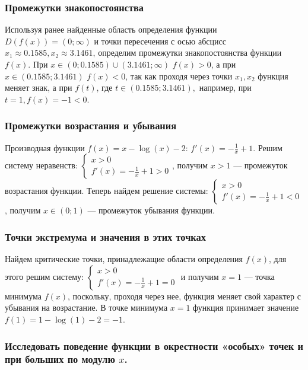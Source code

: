 \documentclass[14pt]{extreport}
\begin{document}
\subsubsection{Промежутки знакопостоянства}

Используя ранее найденные область определения функции $D(f(x)) = (0;\infty)$ и точки пересечения с осью
абсцисс $x_1 \approx 0.1585, x_2 \approx 3.1461$, определим промежутки знакопостоянства функции $f(x)$. 
При $x \in (0; 0.1585)\cup (3.1461; \infty)$ $f(x) > 0$, а при $x \in (0.1585; 3.1461)$ $f(x) < 0$, так как
проходя через точки $x_1, x_2$ функция меняет знак, а при $f(t)$, где $t \in (0.1585; 3.1461),$ например,
при $t = 1, f(x) = -1 < 0$.

\subsubsection{Промежутки возрастания и убывания}

Производная функции $f(x) = x - \log{(x)} - 2$: $f'(x) = -\frac{1}{x} + 1$. Решим систему неравенств:
$\begin{cases}x > 0\\f'(x) = -\frac{1}{x} + 1 > 0\end{cases}$, получим $x > 1$ ---
промежуток возрастания функции. Теперь найдем решение системы: $\begin{cases}x > 0\\f'(x) =
-\frac{1}{x} + 1 < 0\end{cases}$, получим $x \in (0; 1)$ --- промежуток убывания функции.

\subsubsection{Точки экстремума и значения в этих точках}

Найдем критические точки, принадлежащие области определения $f(x)$, для этого решим систему:
$\begin{cases}x > 0\\f'(x) = -\frac{1}{x} + 1 = 0\end{cases}$ и получим $x = 1$ --- точка
минимума $f(x)$, поскольку, проходя через нее, функция меняет свой характер с убывания на возрастание.
В точке минимума $x = 1$ функция принимает значение $f(1) = 1 - \log{(1)} - 2 = -1$.

\subsubsection{Исследовать поведение функции в окрестности «особых» точек и при больших по модулю $x$.}
\end{document}
